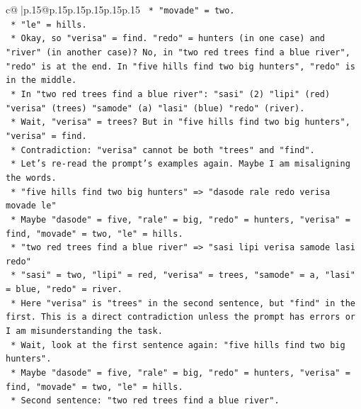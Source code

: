 \documentclass{article}
\begin{document}
{\begin{supertabular}{c@{$\;$}|p{.15\linewidth}@{}p{.15\linewidth}p{.15\linewidth}p{.15\linewidth}p{.15\linewidth}p{.15\linewidth}}
{{{\texttt{                                *   "movade" = two.} \\
\texttt{                                *   "le" = hills.} \\
\texttt{                            *   Okay, so "verisa" = find. "redo" = hunters (in one case) and "river" (in another case)? No, in "two red trees find a blue river", "redo" is at the end. In "five hills find two big hunters", "redo" is in the middle.} \\
\texttt{                            *   In "two red trees find a blue river": "sasi" (2) "lipi" (red) "verisa" (trees) "samode" (a) "lasi" (blue) "redo" (river).} \\
\texttt{                                *   Wait, "verisa" = trees? But in "five hills find two big hunters", "verisa" = find.} \\
\texttt{                                *   Contradiction: "verisa" cannot be both "trees" and "find".} \\
\texttt{                                *   Let's re{-}read the prompt's examples again. Maybe I am misaligning the words.} \\
\texttt{                                *   "five hills find two big hunters" => "dasode rale redo verisa movade le"} \\
\texttt{                                    *   Maybe "dasode" = five, "rale" = big, "redo" = hunters, "verisa" = find, "movade" = two, "le" = hills.} \\
\texttt{                                *   "two red trees find a blue river" => "sasi lipi verisa samode lasi redo"} \\
\texttt{                                    *   "sasi" = two, "lipi" = red, "verisa" = trees, "samode" = a, "lasi" = blue, "redo" = river.} \\
\texttt{                                *   Here "verisa" is "trees" in the second sentence, but "find" in the first. This is a direct contradiction unless the prompt has errors or I am misunderstanding the task.} \\
\texttt{                                *   Wait, look at the first sentence again: "five hills find two big hunters".} \\
\texttt{                                    *   Maybe "dasode" = five, "rale" = big, "redo" = hunters, "verisa" = find, "movade" = two, "le" = hills.} \\
\texttt{                                *   Second sentence: "two red trees find a blue river".} \\
}}}
\end{supertabular}}
\end{document}
